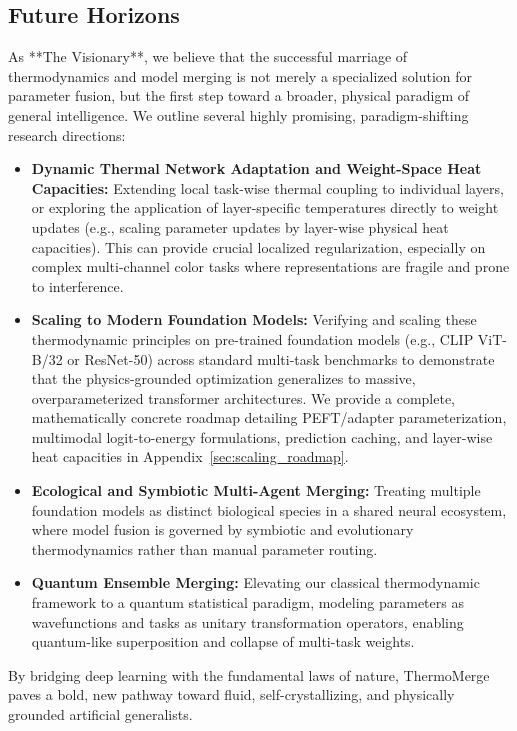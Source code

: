 \subsection{Future Horizons}
As **The Visionary**, we believe that the successful marriage of thermodynamics and model merging is not merely a specialized solution for parameter fusion, but the first step toward a broader, physical paradigm of general intelligence. We outline several highly promising, paradigm-shifting research directions:
\begin{itemize}
    \item \textbf{Dynamic Thermal Network Adaptation and Weight-Space Heat Capacities:} Extending local task-wise thermal coupling to individual layers, or exploring the application of layer-specific temperatures directly to weight updates (e.g., scaling parameter updates by layer-wise physical heat capacities). This can provide crucial localized regularization, especially on complex multi-channel color tasks where representations are fragile and prone to interference.
    \item \textbf{Scaling to Modern Foundation Models:} Verifying and scaling these thermodynamic principles on pre-trained foundation models (e.g., CLIP ViT-B/32 or ResNet-50) across standard multi-task benchmarks to demonstrate that the physics-grounded optimization generalizes to massive, overparameterized transformer architectures. We provide a complete, mathematically concrete roadmap detailing PEFT/adapter parameterization, multimodal logit-to-energy formulations, prediction caching, and layer-wise heat capacities in Appendix~\ref{sec:scaling_roadmap}.
    \item \textbf{Ecological and Symbiotic Multi-Agent Merging:} Treating multiple foundation models as distinct biological species in a shared neural ecosystem, where model fusion is governed by symbiotic and evolutionary thermodynamics rather than manual parameter routing.
    \item \textbf{Quantum Ensemble Merging:} Elevating our classical thermodynamic framework to a quantum statistical paradigm, modeling parameters as wavefunctions and tasks as unitary transformation operators, enabling quantum-like superposition and collapse of multi-task weights.
\end{itemize}

By bridging deep learning with the fundamental laws of nature, ThermoMerge paves a bold, new pathway toward fluid, self-crystallizing, and physically grounded artificial generalists.

